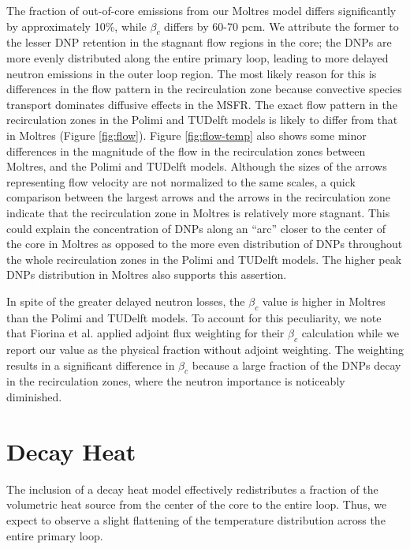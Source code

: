 The fraction of out-of-core emissions from our Moltres model
differs significantly by approximately 10\%, while $\beta_c$ differs by
60-70 pcm. We attribute the former to the lesser \gls{DNP} retention in the
stagnant flow regions in the core; the \glspl{DNP} are more evenly distributed
along the entire primary loop, leading to more delayed neutron emissions in
the outer loop region. The most likely reason for this is differences in the
flow pattern in the recirculation zone because convective species transport
dominates diffusive effects in the \gls{MSFR}. The exact flow pattern in the
recirculation zones in the Polimi and TUDelft models is likely to differ from
that in Moltres (Figure \ref{fig:flow}). Figure \ref{fig:flow-temp} also shows
some minor differences in the magnitude of the flow in the recirculation zones
between Moltres, and the Polimi and TUDelft models. Although the sizes of the
arrows representing flow velocity are not normalized to the same scales, a
quick comparison between the largest arrows and the arrows in the
recirculation zone indicate that the recirculation zone in Moltres is
relatively more stagnant. This could explain the concentration of \glspl{DNP}
along an ``arc'' closer to the center of the core in Moltres as opposed to the
more even distribution of \glspl{DNP} throughout the whole recirculation zones
in the Polimi and TUDelft models. The higher peak \glspl{DNP} distribution in
Moltres also supports this assertion.

In spite of the greater delayed neutron losses, the $\beta_c$ value is higher
in Moltres than the Polimi and TUDelft models. To account for this
peculiarity, we note that Fiorina et al. \cite{fiorina_modelling_2014}
applied adjoint flux weighting for their $\beta_c$ calculation while we report
our value as the physical fraction without adjoint weighting. The weighting
results in a significant difference in $\beta_c$ because a large fraction of
the \glspl{DNP} decay in the recirculation zones, where the neutron importance
is noticeably diminished.

\section{Decay Heat}

The inclusion of a decay heat model effectively redistributes a fraction of
the volumetric heat source from the center of the core to the entire loop.
Thus, we expect to observe a slight flattening of the temperature distribution
across the entire primary loop.
